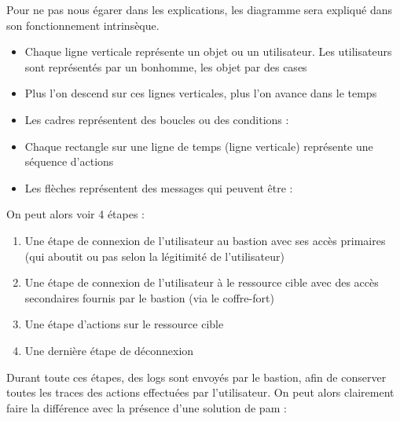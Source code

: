 Pour ne pas nous égarer dans les explications, les diagramme sera expliqué dans son fonctionnement intrinsèque.

\begin{itemize}
	\item Chaque ligne verticale représente un objet ou un utilisateur. Les utilisateurs sont représentés par un bonhomme, les objet par des cases
	\item Plus l'on descend sur ces lignes verticales, plus l'on avance dans le temps
	\item Les cadres représentent des boucles ou des conditions :
	\item Chaque rectangle sur une ligne de temps (ligne verticale) représente une séquence d'actions
	\item Les flèches représentent des messages qui peuvent être :
\end{itemize}

On peut alors voir 4 étapes :

\begin{enumerate}
	\item Une étape de connexion de l'utilisateur au bastion avec ses accès primaires (qui aboutit ou pas selon la légitimité de l'utilisateur)
	\item Une étape de connexion de l'utilisateur à le ressource cible avec des accès secondaires fournis par le bastion (via le coffre-fort)
	\item Une étape d'actions sur le ressource cible
	\item Une dernière étape de déconnexion
\end{enumerate}

Durant toute ces étapes, des logs sont envoyés par le bastion, afin de conserver toutes les traces des actions effectuées par l'utilisateur. On peut alors clairement faire la différence avec la présence d'une solution de \gls{pam} :

